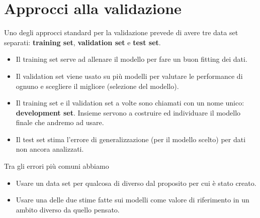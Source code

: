 \section{Approcci alla validazione}
Uno degli approcci standard per la validazione prevede di avere tre data set separati: \textbf{training set},
\textbf{validation set} e \textbf{test set}.
\begin{itemize}
	\item Il training set serve ad allenare il modello per fare un buon fitting dei dati.
	\item Il validation set viene usato su pi\`u modelli per valutare le performance di ognuno e scegliere il migliore
	      (selezione del modello).
	\item Il training set e il validation set a volte sono chiamati con un nome unico: \textbf{development set}. Insieme
	      servono a costruire ed individuare il modello finale che andremo ad usare.
	\item Il test set stima l'errore di generalizzazione (per il modello scelto) per dati non ancora analizzati.
\end{itemize}
Tra gli errori pi\`u comuni abbiamo
\begin{itemize}
	\item Usare un data set per qualcosa di diverso dal proposito per cui \`e stato creato.
	\item Usare una delle due stime fatte sui modelli come valore di riferimento in un ambito diverso da quello pensato.
\end{itemize}